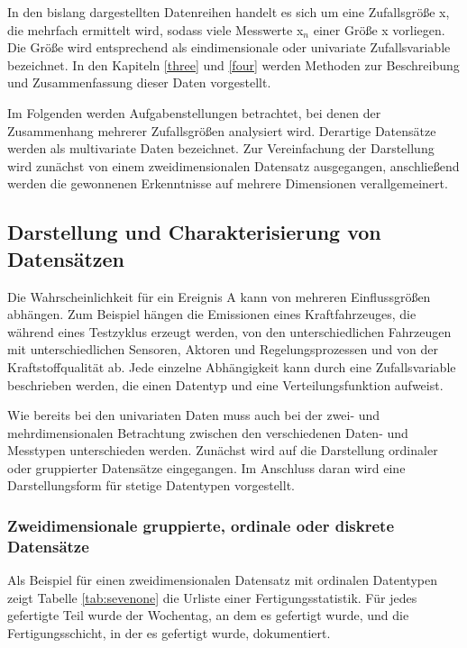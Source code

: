 \noindent In den bislang dargestellten Datenreihen handelt es sich um eine Zufallsgr\"{o}{\ss}e x, die mehrfach ermittelt wird, sodass viele Messwerte x$_{n}$ einer Gr\"{o}{\ss}e x vorliegen. Die Gr\"{o}{\ss}e wird entsprechend als eindimensionale oder univariate Zufallsvariable bezeichnet. In den Kapiteln \ref{three} und \ref{four} werden Methoden zur Beschreibung und Zusammenfassung dieser Daten vorgestellt. \newline

\noindent Im Folgenden werden Aufgabenstellungen betrachtet, bei denen der Zusammenhang mehrerer Zufallsgr\"{o}{\ss}en analysiert wird. Derartige Datens\"{a}tze werden als multivariate Daten bezeichnet. Zur Vereinfachung der Darstellung wird zun\"{a}chst von einem zweidimensionalen Datensatz ausgegangen, anschlie{\ss}end werden die gewonnenen Erkenntnisse auf mehrere Dimensionen verallgemeinert.

\subsection{Darstellung und Charakterisierung von Datens\"{a}tzen}

\noindent Die Wahrscheinlichkeit f\"{u}r ein Ereignis A kann von mehreren Einflussgr\"{o}{\ss}en abh\"{a}ngen. Zum Beispiel h\"{a}ngen die Emissionen eines Kraftfahrzeuges, die w\"{a}hrend eines Testzyklus erzeugt werden, von den unterschiedlichen Fahrzeugen mit unterschiedlichen Sensoren, Aktoren und Regelungsprozessen und von der Kraftstoffqualit\"{a}t ab. Jede einzelne Abh\"{a}ngigkeit kann durch eine Zufallsvariable beschrieben werden, die einen Datentyp und eine Verteilungsfunktion aufweist. \newline

\noindent Wie bereits bei den univariaten Daten muss auch bei der zwei- und mehrdimensionalen Betrachtung zwischen den verschiedenen Daten- und Messtypen unterschieden werden. Zun\"{a}chst wird auf die Darstellung ordinaler oder gruppierter Datens\"{a}tze eingegangen. Im Anschluss daran wird eine Darstellungsform f\"{u}r stetige Datentypen vorgestellt.

\subsubsection{Zweidimensionale gruppierte, ordinale oder diskrete Datens\"{a}tze}

\noindent Als Beispiel f\"{u}r einen zweidimensionalen Datensatz mit ordinalen Datentypen zeigt Tabelle \ref{tab:sevenone} die Urliste einer Fertigungsstatistik. F\"{u}r jedes gefertigte Teil wurde der Wochentag, an dem es gefertigt wurde, und die Fertigungsschicht, in der es gefertigt wurde, dokumentiert.

